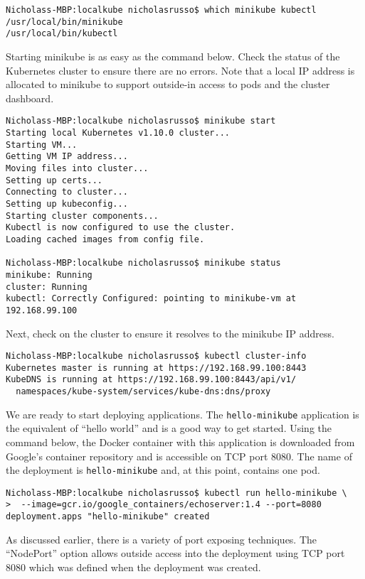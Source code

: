 \begin{verbatim}
Nicholass-MBP:localkube nicholasrusso$ which minikube kubectl
/usr/local/bin/minikube
/usr/local/bin/kubectl
\end{verbatim}

Starting minikube is as easy as the command below. Check the status of the
Kubernetes cluster to ensure there are no errors. Note that a local IP address
is allocated to minikube to support outside-in access to pods and the cluster
dashboard.

\begin{verbatim}
Nicholass-MBP:localkube nicholasrusso$ minikube start
Starting local Kubernetes v1.10.0 cluster...
Starting VM...
Getting VM IP address...
Moving files into cluster...
Setting up certs...
Connecting to cluster...
Setting up kubeconfig...
Starting cluster components...
Kubectl is now configured to use the cluster.
Loading cached images from config file.

Nicholass-MBP:localkube nicholasrusso$ minikube status
minikube: Running
cluster: Running
kubectl: Correctly Configured: pointing to minikube-vm at 192.168.99.100
\end{verbatim}

Next, check on the cluster to ensure it resolves to the minikube IP address.

\begin{verbatim}
Nicholass-MBP:localkube nicholasrusso$ kubectl cluster-info
Kubernetes master is running at https://192.168.99.100:8443
KubeDNS is running at https://192.168.99.100:8443/api/v1/
  namespaces/kube-system/services/kube-dns:dns/proxy
\end{verbatim}

We are ready to start deploying applications. The \verb|hello-minikube| application
is the equivalent of ``hello world'' and is a good way to get started. Using the
command below, the Docker container with this application is downloaded from
Google's container repository and is accessible on TCP port 8080. The name of
the deployment is \verb|hello-minikube| and, at this point, contains one pod.

\begin{verbatim}
Nicholass-MBP:localkube nicholasrusso$ kubectl run hello-minikube \
>  --image=gcr.io/google_containers/echoserver:1.4 --port=8080
deployment.apps "hello-minikube" created
\end{verbatim}

As discussed earlier, there is a variety of port exposing techniques. The
``NodePort'' option allows outside access into the deployment using TCP port
8080 which was defined when the deployment was created.

